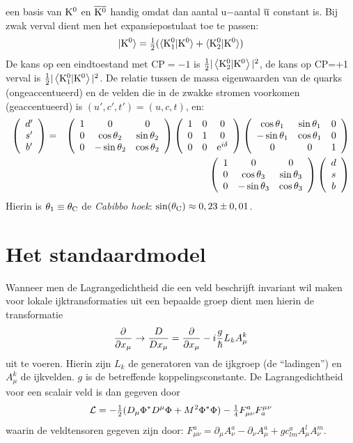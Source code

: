 \documentclass[twoside]{report}
\begin{document}
een basis van $\rm K^0$ en $\rm\overline{K^0}$ handig omdat dan
aantal u$-$aantal$~\overline{\rm u}$ constant is. Bij zwak verval dient men het
expansiepostulaat toe te passen:
\[
\rm|K^0\rangle=\mbox{$\frac{1}{2}$}(\langle K_1^0|K^0\rangle+\langle K_2^0|K^0\rangle)
\]
De kans op een eindtoestand met CP$=-1$ is $\rm\mbox{$\frac{1}{2}$}|\left\langle K_2^0|K^0 \right\rangle|^2$, de
kans op CP=+1 verval is $\rm\mbox{$\frac{1}{2}$}|\left\langle K_1^0|K^0 \right\rangle|^2$.
\npar
De relatie tussen de massa eigenwaarden van de quarks (ongeaccentueerd) en de
velden die in de zwakke stromen voorkomen (geaccentueerd) is
$(u',c',t')=(u,c,t)$, en:
\begin{eqnarray*}
\left(\begin{array}{c}d'\\s'\\b'\end{array}\right)&=&
\left(\begin{array}{ccc}
1&0&0\\
0&\cos\theta_2&\sin\theta_2\\
0&-\sin\theta_2&\cos\theta_2
\end{array}\right)
\left(\begin{array}{ccc}
1&0&0\\
0&1&0\\
0&0&{\rm e}^{i\delta}
\end{array}\right)
\left(\begin{array}{ccc}
\cos\theta_1&\sin\theta_1&0\\
-\sin\theta_1&\cos\theta_1&0\\
0&0&1\\
\end{array}\right)\\
&&\left(\begin{array}{ccc}
1&0&0\\
0&\cos\theta_3&\sin\theta_3\\
0&-\sin\theta_3&\cos\theta_3\\
\end{array}\right)
\left(\begin{array}{c}d\\s\\b\end{array}\right)
\end{eqnarray*}
Hierin is $\theta_1\equiv\theta_{\rm C}$ de {\it Cabibbo hoek}:
$\sin(\theta_{\rm C})\approx0,23\pm0,01$.

\section[~~Het standaardmodel]{Het standaardmodel}
Wanneer men de Lagrangedichtheid die een veld beschrijft invariant wil maken
voor lokale ijktransformaties uit een bepaalde groep dient men hierin de
transformatie
\[
\frac{\partial }{\partial x_\mu}\rightarrow\frac{D}{Dx_\mu}=\frac{\partial }{\partial x_\mu}-i\frac{g}{\hbar}L_kA_\mu^k
\]
uit te voeren. Hierin zijn $L_k$ de generatoren van de ijkgroep (de ``ladingen'')
en $A_\mu^k$ de ijkvelden. $g$ is de betreffende koppelingsconstante. De
Lagrangedichtheid voor een scalair veld is dan gegeven door
\[
{\cal L}=-\mbox{$\frac{1}{2}$}(D_\mu\Phi^*D^\mu\Phi+M^2\Phi^*\Phi)-\mbox{$\frac{1}{4}$} F_{\mu\nu}^aF_a^{\mu\nu}
\]
waarin de veldtensoren gegeven zijn door:
$F^a_{\mu\nu}=\partial_\mu A^a_\nu-\partial_\nu A^a_\mu+gc^a_{lm}A_\mu^lA_\nu^m$.
\end{document}
